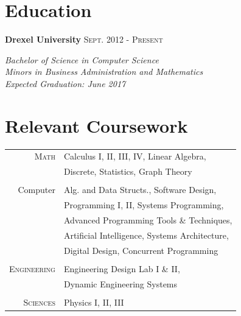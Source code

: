 \documentclass[10pt]{article}
\begin{document}
{\begin{minipage}[t]{0.44\textwidth}

\section{Education} 

\textbf{Drexel University} \hfill \textsc{Sept. 2012 - Present}

\textit{\hspace*{5 mm}Bachelor of Science in Computer Science}\\
\textit{\hspace*{5 mm}Minors in Business Administration and Mathematics}\\
\textit{\hspace*{5 mm}Expected Graduation: June 2017}\\



\section{Relevant Coursework} 


\begin{tabular}{rl}
\textsc{Math}
& Calculus I, II, III, IV, Linear Algebra, \\
& Discrete, Statistics, Graph Theory\\\\
Computer
& Alg. and Data Structs., Software Design, \\
& Programming I, II, Systems Programming, \\
& Advanced Programming Tools \& Techniques, \\
& Artificial Intelligence, Systems Architecture, \\
& Digital Design, Concurrent Programming \\\\
\textsc{Engineering}
& Engineering Design Lab I \& II, \\
& Dynamic Engineering Systems\\\\
\textsc{Sciences}
& Physics I, II, III
\end{tabular}\\[10pt]



\end{minipage}}
\end{document}
